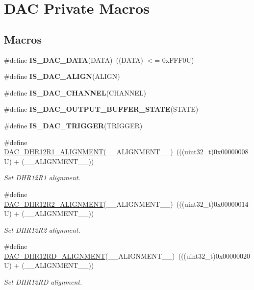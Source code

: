 \hypertarget{group___d_a_c___private___macros}{}\section{D\+AC Private Macros}
\label{group___d_a_c___private___macros}
\subsection*{Macros}
\begin{DoxyCompactItemize}
\item 
\mbox{\label{group___d_a_c___private___macros_ga903e28d4971e172b37c1c2fc17c2a884}} 
\#define {\bfseries I\+S\+\_\+\+D\+A\+C\+\_\+\+D\+A\+TA}(D\+A\+TA)~((D\+A\+TA) $<$= 0x\+F\+F\+F0\+U)
\item 
\#define {\bfseries I\+S\+\_\+\+D\+A\+C\+\_\+\+A\+L\+I\+GN}(A\+L\+I\+GN)
\item 
\#define {\bfseries I\+S\+\_\+\+D\+A\+C\+\_\+\+C\+H\+A\+N\+N\+EL}(C\+H\+A\+N\+N\+EL)
\item 
\#define {\bfseries I\+S\+\_\+\+D\+A\+C\+\_\+\+O\+U\+T\+P\+U\+T\+\_\+\+B\+U\+F\+F\+E\+R\+\_\+\+S\+T\+A\+TE}(S\+T\+A\+TE)
\item 
\#define {\bfseries I\+S\+\_\+\+D\+A\+C\+\_\+\+T\+R\+I\+G\+G\+ER}(T\+R\+I\+G\+G\+ER)
\item 
\#define \mbox{\hyperlink{group___d_a_c___private___macros_gac3ebca33500c1a69df8b9b7ded88a9f5}{D\+A\+C\+\_\+\+D\+H\+R12\+R1\+\_\+\+A\+L\+I\+G\+N\+M\+E\+NT}}(\+\_\+\+\_\+\+A\+L\+I\+G\+N\+M\+E\+N\+T\+\_\+\+\_\+)~(((uint32\+\_\+t)0x00000008\+U) + (\+\_\+\+\_\+\+A\+L\+I\+G\+N\+M\+E\+N\+T\+\_\+\+\_\+))
\begin{DoxyCompactList}\small\item\em Set D\+H\+R12\+R1 alignment. \end{DoxyCompactList}\item 
\#define \mbox{\hyperlink{group___d_a_c___private___macros_ga25186bb99978d84bb1b0103a1a023947}{D\+A\+C\+\_\+\+D\+H\+R12\+R2\+\_\+\+A\+L\+I\+G\+N\+M\+E\+NT}}(\+\_\+\+\_\+\+A\+L\+I\+G\+N\+M\+E\+N\+T\+\_\+\+\_\+)~(((uint32\+\_\+t)0x00000014\+U) + (\+\_\+\+\_\+\+A\+L\+I\+G\+N\+M\+E\+N\+T\+\_\+\+\_\+))
\begin{DoxyCompactList}\small\item\em Set D\+H\+R12\+R2 alignment. \end{DoxyCompactList}\item 
\#define \mbox{\hyperlink{group___d_a_c___private___macros_ga3d35c7e3872d5b79f83a7efdfe3df5f0}{D\+A\+C\+\_\+\+D\+H\+R12\+R\+D\+\_\+\+A\+L\+I\+G\+N\+M\+E\+NT}}(\+\_\+\+\_\+\+A\+L\+I\+G\+N\+M\+E\+N\+T\+\_\+\+\_\+)~(((uint32\+\_\+t)0x00000020\+U) + (\+\_\+\+\_\+\+A\+L\+I\+G\+N\+M\+E\+N\+T\+\_\+\+\_\+))
\begin{DoxyCompactList}\small\item\em Set D\+H\+R12\+RD alignment. \end{DoxyCompactList}\end{DoxyCompactItemize}


